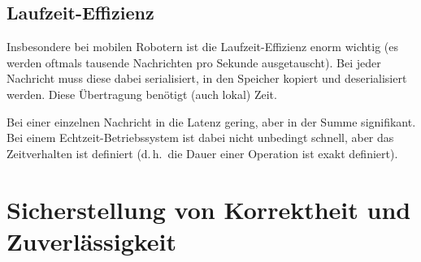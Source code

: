 \documentclass[a4paper, 11pt, accentcolor = tud3b]{tudreport}
\renewcommand{\dh}{d.\,h.~}
\begin{document}
			\subsection{Laufzeit-Effizienz}
				Insbesondere bei mobilen Robotern ist die Laufzeit-Effizienz enorm wichtig (es werden oftmals tausende Nachrichten pro Sekunde ausgetauscht). Bei jeder Nachricht muss diese dabei serialisiert, in den Speicher kopiert und deserialisiert werden. Diese Übertragung benötigt (auch lokal) Zeit.
				
				Bei einer einzelnen Nachricht in die Latenz gering, aber in der Summe signifikant. Bei einem Echtzeit-Betriebssystem ist dabei nicht unbedingt schnell, aber das Zeitverhalten ist definiert (\dh die Dauer einer Operation ist exakt definiert).

		\section{Sicherstellung von Korrektheit und Zuverlässigkeit}
\end{document}
